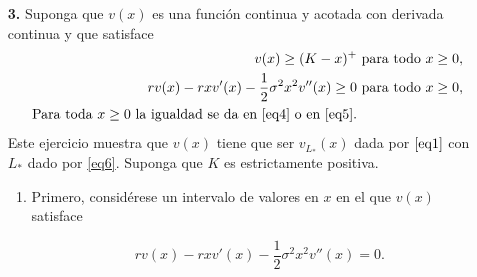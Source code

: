 \documentclass[letterpaper]{article}
\newcommand{\1}{\mathds{1}}
\theoremstyle{definition}
\theoremstyle{definition}
\theoremstyle{definition}
\theoremstyle{definition}
\theoremstyle{definition}
\begin{document}
\begin{itemize}
\begin{proof}
\begin{itemize}
        $x=\frac{L}{2}$. Es claro que entonces $0<x<L<K_1<K_2$. Notamos que no se da la igualdad en \eqref{eq3}: como $0<x<L$, entonces $v_2(x)=K_2-x$ y así,
        según las derivadas calculadas antes,
        \[
        rv_2(x)-rxv_2'(x)-\frac{1}{2}\sigma^2x^2v_2''(x)=r(K_2-x)-rx(-1)-0=rK_2-rx+rx=rK_2,
        \]
        y como $r,K_2>0$ por hipótesis, entonces se da la desigualdad estricta en \eqref{eq3}. Por otro lado, 
        nótese que tampoco se da la igualdad en \eqref{eq2}, esto ya que 
        \[
        v_2(x)=K_2-x.    
        \]
        Mientras que 
        \[   
            (K_1-x)^{+}=K_1-x,
        \]
        porque $0<L/2=x<L<K_1<k_2$. Se sigue que, si se diera la igualdad en \eqref{eq2}, entonces
        \[
            K_2-x=K_1-x \iff K_2=K_1,
        \]
        lo cual es una contradicción. Por lo tanto, no se da la igualdad en \eqref{eq2} y con ello, 
        el precio $v_2$ de la opción con precio de strike $K_2>K_1$ no satisface la tercera de las condiciones 
        lineales complementarias para el precio de strike $K_1$.
    \end{itemize}
     \end{proof}
    \item[\textbf{3.}] Suponga que $v(x)$ es una función continua y acotada con derivada continua 
    y que satisface 
    \begin{eqnarray}
        v(x)\geq (K-x)^{+} & \text{ para todo } x\geq 0,\label{eq4}\\ 
        rv(x)-rxv'(x)-\frac{1}{2}\sigma^2 x^2v''(x)\geq 0 & \text{ para todo } x\geq0,\label{eq5}\\
        \text{Para toda } x\geq0 \text{ la igualdad se da en \eqref{eq4} o en \eqref{eq5}.}
    \end{eqnarray}
    Este ejercicio muestra que $v(x)$ tiene que ser $v_{L_*}(x)$ dada por $\eqref{eq1}$ con $L_*$ dado por \eqref{eq6}.
    Suponga que $K$ es estrictamente positiva. 
    \begin{enumerate}
        \item Primero, considérese un intervalo de valores en $x$ en el que $v(x)$ satisface 
        
        \begin{equation}\label{eq7}
                rv(x)-rxv'(x)-\frac{1}{2}\sigma^2x^2v''(x)=0.    
        \end{equation}
        

\end{enumerate}
\end{itemize}
\end{document}
